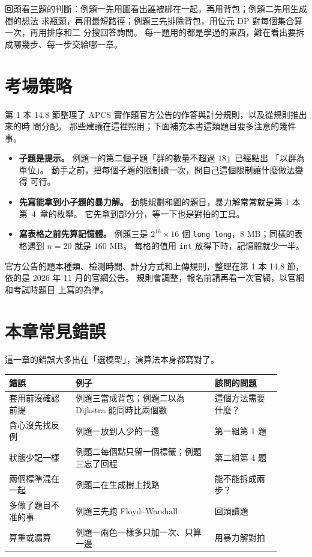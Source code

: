 回頭看三題的判斷：例題一先用圖看出誰被綁在一起，再用背包；例題二先用生成樹的想法
求瓶頸，再用最短路徑；例題三先排除背包，用位元 DP 對每個集合算一次，再用排序和二
分搜回答詢問。 每一題用的都是學過的東西，難在看出要拆成哪幾步、每一步交給哪一章。

\section{考場策略}
\label{sec:cap-exam}

第 1 本 14.8 節整理了 APCS 實作題官方公告的作答與計分規則，以及從規則推出來的時
間分配。 那些建議在這裡照用；下面補充本書這類題目要多注意的幾件事。

\begin{itemize}
\item \textbf{子題是提示。} 例題一的第二個子題「群的數量不超過 $18$」已經點出
「以群為單位」。 動手之前，把每個子題的限制讀一次，問自己這個限制讓什麼做法變得
可行。
\item \textbf{先寫能拿到小子題的暴力解。} 動態規劃和圖的題目，暴力解常常就是第
1 本第~4~章的枚舉。 它先拿到部分分，等一下也是對拍的工具。
\item \textbf{寫表格之前先算記憶體。} 例題三是 $2^{16} \times 16$ 個
\texttt{long long}，$8$ MB；同樣的表格遇到 $n = 20$ 就是 $160$ MB。 每格的值用
\texttt{int} 放得下時，記憶體就少一半。
\end{itemize}

\begin{apcsnote}
官方公告的題本種類、檢測時間、計分方式和上傳規則，整理在第 1 本 14.8 節，依的是
2026 年 11 月的官網公告。 規則會調整，報名前請再看一次官網，以官網和考試時題目
上寫的為準。
\end{apcsnote}

\section{本章常見錯誤}
\label{sec:cap-pitfalls}

這一章的錯誤大多出在「選模型」，演算法本身都寫對了。

\begin{center}
\begin{tabular}{p{0.22\linewidth}p{0.46\linewidth}p{0.22\linewidth}}
\toprule
錯誤 & 例子 & 該問的問題 \\
\midrule
套用前沒確認前提 & 例題三當成背包；例題二以為 Dijkstra 能同時比兩個數 & 這個方法需要
什麼？ \\
貪心沒先找反例 & 例題一放到人少的一邊 & 第一組第 1 題 \\
狀態少記一樣 & 例題二每個點只留一個標籤；例題三忘了回程 & 第二組第 4 題 \\
兩個標準混在一起 & 例題二在生成樹上找路 & 能不能拆成兩步？ \\
多做了題目不准的事 & 例題三先跑 Floyd--Warshall & 回頭讀題 \\
算重或漏算 & 例題一兩色一樣多只加一次、只算一邊 & 用暴力解對拍 \\
\bottomrule
\end{tabular}
\end{center}

